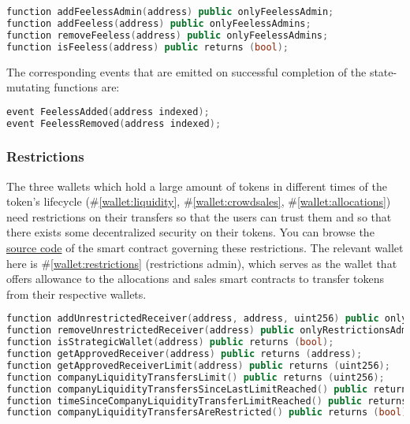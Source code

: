 \documentclass[a4paper,12pt]{article}
\begin{document}
\begin{lstlisting}[language=C++, caption=Solidity feeless functions.]
function addFeelessAdmin(address) public onlyFeelessAdmin;
function addFeeless(address) public onlyFeelessAdmins;
function removeFeeless(address) public onlyFeelessAdmins;
function isFeeless(address) public returns (bool);
\end{lstlisting}
The corresponding events that are emitted on successful completion of the state-mutating functions are:
\begin{lstlisting}[language=C++, caption=Solidity feeless events.]
event FeelessAdded(address indexed);
event FeelessRemoved(address indexed);
\end{lstlisting}

\subsubsection{Restrictions}

The three wallets which hold a large amount of tokens in different times of the token's lifecycle (\#\ref{wallet:liquidity}, \#\ref{wallet:crowdsales}, \#\ref{wallet:allocations}) need restrictions on their transfers so that the users can trust them and so that there exists some decentralized security on their tokens. You can browse the \href{https://github.com/UAB-BITmarkets/token/blob/master/contracts/token/ERC20StrategicWalletRestrictions.sol}{source code} of the smart contract governing these restrictions.
The relevant wallet here is \#\ref{wallet:restrictions} (restrictions admin), which serves as the wallet that offers allowance to the allocations and sales smart contracts to transfer tokens from their respective wallets.
\begin{lstlisting}[language=C++, caption=Solidity strategic wallets restriction functions.]
function addUnrestrictedReceiver(address, address, uint256) public onlyRestrictionsAdmin;
function removeUnrestrictedReceiver(address) public onlyRestrictionsAdmin;
function isStrategicWallet(address) public returns (bool);
function getApprovedReceiver(address) public returns (address);
function getApprovedReceiverLimit(address) public returns (uint256);
function companyLiquidityTransfersLimit() public returns (uint256);
function companyLiquidityTransfersSinceLastLimitReached() public returns (uint256);
function timeSinceCompanyLiquidityTransferLimitReached() public returns (uint256);
function companyLiquidityTransfersAreRestricted() public returns (bool);
\end{lstlisting}
\end{document}
